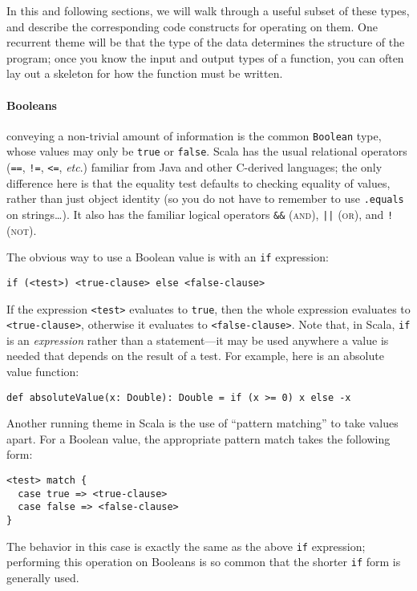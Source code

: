 In this and following sections, we will walk through a useful subset of these types, and describe the corresponding code constructs for operating on them. One recurrent theme will be that the type of the data determines the structure of the program; once you know the input and output types of a function, you can often lay out a skeleton for how the function must be written.

\paragraph{Booleans}
 conveying a non-trivial amount of information is the common \verb|Boolean| type, whose values may only be \verb|true| or \verb|false|. Scala has the usual relational operators (\verb|==|, \verb|!=|, \verb|<=|, \textit{etc}.) familiar from Java and other C-derived languages; the only difference here is that the equality test defaults to checking equality of values, rather than just object identity (so you do not have to remember to use \verb|.equals| on strings\ldots). It also has the familiar logical operators \verb|&&| (\textsc{and}), \verb-||- (\textsc{or}), and \verb|!| (\textsc{not}).

The obvious way to use a Boolean value is with an \verb|if| expression:
\begin{verbatim}
if (<test>) <true-clause> else <false-clause>
\end{verbatim}
If the expression \verb|<test>| evaluates to \verb|true|, then the whole expression evaluates to \verb|<true-clause>|, otherwise it evaluates to \verb|<false-clause>|. Note that, in Scala, \verb|if| is an \emph{expression} rather than a statement---it may be used anywhere a value is needed that depends on the result of a test. For example, here is an absolute value function:
\begin{verbatim}
def absoluteValue(x: Double): Double = if (x >= 0) x else -x
\end{verbatim}

Another running theme in Scala is the use of ``pattern matching'' to take values apart. For a Boolean value, the appropriate pattern match takes the following form:
\begin{verbatim}
<test> match {
  case true => <true-clause>
  case false => <false-clause>
}
\end{verbatim}
The behavior in this case is exactly the same as the above \verb|if| expression; performing this operation on Booleans is so common that the shorter \verb|if| form is generally used.

